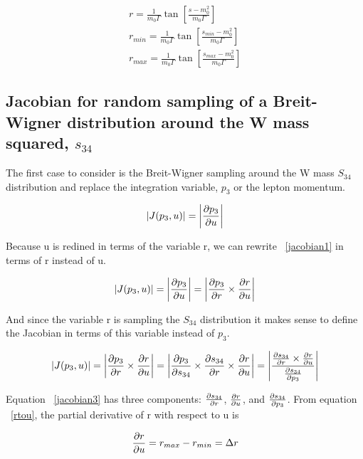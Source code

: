 \begin{eqnarray}
\label{definer}
r = \frac{1}{m_{0}\Gamma} \tan \left[ \frac{s - m_{0}^{2}}{m_{0}\Gamma} \right] \\
r_{min} = \frac{1}{m_{0}\Gamma} \tan \left[ \frac{s_{min} -
m_{0}^{2}}{m_{0}\Gamma} \right] \\
r_{max} = \frac{1}{m_{0}\Gamma} \tan \left[ \frac{s_{max} - m_{0}^{2}}{m_{0}\Gamma} \right]
\end{eqnarray}



\subsection{Jacobian for random sampling of a Breit-Wigner distribution around
the W mass squared, $s_{34}$}

The first case to consider is the Breit-Wigner sampling around the W mass
$S_{34}$ distribution and replace the integration variable, $p_{3}$ or the
lepton momentum.

\begin{equation}
\label{jacobian1}
|J(p_{3}, u)| = \left| \frac{\partial p_{3}}{\partial u} \right| 
\end{equation}

Because u is redined in terms of the variable r, we can rewrite ~\ref{jacobian1}
in terms of r instead of u.

\begin{equation}
\label{jacobian2}
|J(p_{3}, u)| = \left| \frac{\partial p_{3}}{\partial u} \right| = \left| \frac{\partial p_{3}}{\partial r}
\times \frac{\partial r}{\partial u} \right|
\end{equation}

And since the variable r is sampling the $S_{34}$ distribution it makes sense to
define the Jacobian in terms of this variable instead of $p_{3}$.

\begin{equation}
\label{jacobian3}
|J(p_{3}, u)| = \left| \frac{\partial p_{3}}{\partial r} \times \frac{\partial r}{\partial u} \right| = \left|
\frac{\partial p_{3}}{\partial s_{34}} \times \frac{\partial s_{34}}{\partial r} \times \frac{\partial r}{\partial u} \right| =
\left | \frac{\frac{\partial s_{34}}{\partial r} \times
\frac{\partial r}{\partial u}}{\frac{\partial s_{34}}{\partial p_{3}}} \right |
\end{equation}

Equation ~\ref{jacobian3} has three components: $\frac{\partial s_{34}}{\partial r}$,
$\frac{\partial r}{\partial u}$, and $\frac{\partial s_{34}}{\partial p_{3}}$. From equation ~\ref{rtou}, the
partial derivative of r with respect to u is 

\begin{equation}
\label{drdu}
\frac{\partial r}{\partial u} = r_{max} - r_{min} = \Delta r
\end{equation}

